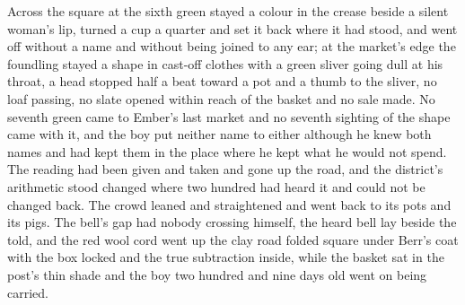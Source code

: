 Across the square at  the sixth green stayed a colour in the crease beside a silent woman's lip, turned a cup a quarter and set it back where it had stood, and went off without a name and without being joined to any ear; at the market's edge the foundling stayed a shape in cast-off clothes with a green sliver going dull at his throat, a head stopped half a beat toward a pot and a thumb to the sliver, no loaf passing, no slate opened within reach of the basket and no sale made. No seventh green came to Ember's last market and no seventh sighting of the shape came with it, and the boy put neither name to either although he knew both names and had kept them in the place where he kept what he would not spend. The reading had been given and taken and gone up the road, and the district's arithmetic stood changed where two hundred had heard it and could not be changed back. The crowd leaned and straightened and went back to its pots and its pigs. The bell's gap had nobody crossing himself, the heard bell lay beside the told, and the red wool cord went up the clay road folded square under Berr's coat with the box locked and the true subtraction inside, while the basket sat in the post's thin shade and the boy two hundred and nine days old went on being carried.
